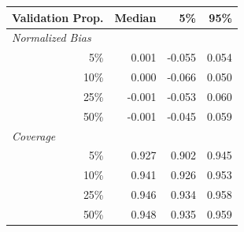 \begin{tabular}[t]{r|rrr}
\toprule
Validation Prop. & Median & 5\% & 95\% \\
\midrule
\multicolumn{1}{l|}{\textit{Normalized Bias}} \\
5\% & 0.001 & -0.055 & 0.054 \\
10\% & 0.000 & -0.066 & 0.050 \\
25\% & -0.001 & -0.053 & 0.060 \\
50\% & -0.001 & -0.045 & 0.059 \\
\midrule 
\multicolumn{1}{l|}{\textit{Coverage}} \\
5\% & 0.927 & 0.902 & 0.945 \\
10\% & 0.941 & 0.926 & 0.953 \\
25\% & 0.946 & 0.934 & 0.958 \\
50\% & 0.948 & 0.935 & 0.959 \\
\bottomrule
\end{tabular}